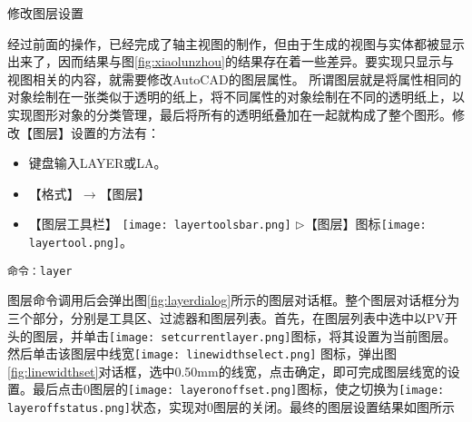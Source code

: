\begin{procedure}

\item 修改图层设置

经过前面的操作，已经完成了轴主视图的制作，但由于生成的视图与实体都被显示出来了，因而结果与图\ref{fig:xiaolunzhou}的结果存在着一些差异。要实现只显示与视图相关的内容，就需要修改AutoCAD的图层属性。 所谓图层就是将属性相同的对象绘制在一张类似于透明的纸上，将不同属性的对象绘制在不同的透明纸上，以实现图形对象的分类管理，最后将所有的透明纸叠加在一起就构成了整个图形。修改【图层】设置的方法有：
\begin{itemize}
\item 键盘输入LAYER或LA。
\item 【格式】$\rightarrow$【图层】
\item 【图层工具栏】 \texttt{[image: layertoolsbar.png]} $\triangleright$【图层】图标\texttt{[image: layertool.png]}。
\end{itemize}
\begin{lstlisting}
命令：layer
\end{lstlisting}

图层命令调用后会弹出图\ref{fig:layerdialog}所示的图层对话框。整个图层对话框分为三个部分，分别是工具区、过滤器和图层列表。首先，在图层列表中选中以PV开头的图层，并单击\texttt{[image: setcurrentlayer.png]}图标，将其设置为当前图层。然后单击该图层中线宽\texttt{[image: linewidthselect.png]} 图标，弹出图\ref{fig:linewidthset}对话框，选中0.50mm的线宽，点击确定，即可完成图层线宽的设置。最后点击0图层的\texttt{[image: layeronoffset.png]}图标，使之切换为\texttt{[image: layeroffstatus.png]}状态，实现对0图层的关闭。最终的图层设置结果如图所示


\end{procedure}
